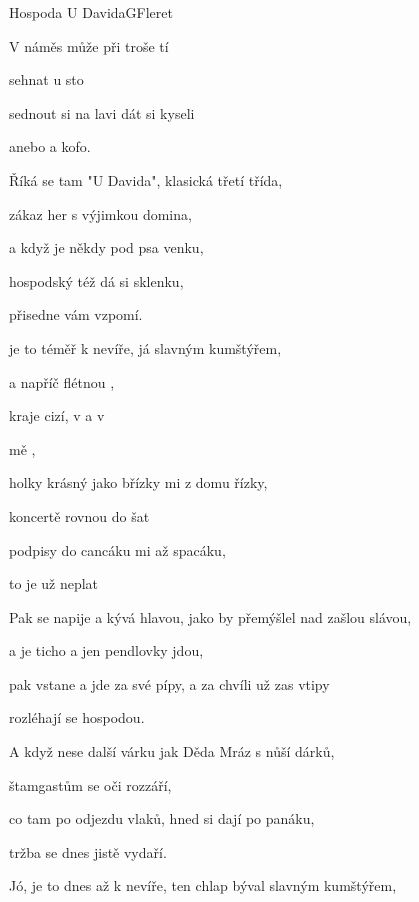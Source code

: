 \begin{song}{Hospoda U Davida}{G}{Fleret}
\begin{SBVerse}
V   náměs může při troše tí

sehnat  u sto

sednout si na lavi dát si  kyseli

anebo  a kofo.

Říká se tam "U Davida", klasická třetí třída,

zákaz her s výjimkou domina,

a když je někdy pod psa venku, 

hospodský též dá si sklenku,

přisedne vám vzpomí.
\end{SBVerse}
\begin{SBChorus}
 je to téměř k nevíře, já  slavným kumštýřem,

 a napříč flétnou ,

 kraje cizí, v  a v 

 mě ,

holky krásný jako břízky  mi z domu řízky,

koncertě rovnou do šat

podpisy do cancáku  mi až  spacáku,

to je  už neplat
\end{SBChorus}

\begin{SBVerse}
Pak se napije a kývá hlavou, jako by přemýšlel nad zašlou slávou,

a je ticho a jen pendlovky jdou,

pak vstane a jde za své pípy, a za chvíli už zas vtipy

rozléhají se hospodou.

A když nese další várku jak Děda Mráz s nůší dárků,

štamgastům se oči rozzáří,

co tam po odjezdu vlaků, hned si dají po panáku,

tržba se dnes jistě vydaří.
\end{SBVerse}
\begin{SBChorus}
Jó, je to dnes až k nevíře, ten chlap býval slavným kumštýřem,


\end{SBChorus}
\end{song}

